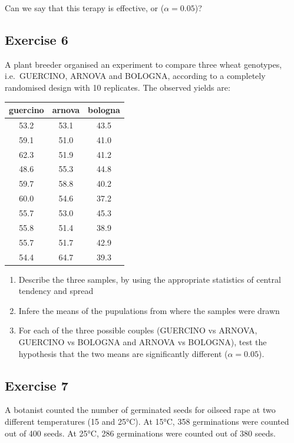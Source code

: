 \documentclass[a4paper,12pt,oneside]{book}
\providecommand{\tightlist}{%
  \setlength{\itemsep}{0pt}\setlength{\parskip}{0pt}}
\begin{document}
Can we say that this terapy is effective, or (\(\alpha = 0.05\))?

\hypertarget{exercise-6-1}{%
\subsection{Exercise 6}\label{exercise-6-1}}

A plant breeder organised an experiment to compare three wheat genotypes, i.e.~GUERCINO, ARNOVA and BOLOGNA, according to a completely randomised design with 10 replicates. The observed yields are:

\begin{tabular}{c|c|c}
\hline
guercino & arnova & bologna\\
\hline
53.2 & 53.1 & 43.5\\
\hline
59.1 & 51.0 & 41.0\\
\hline
62.3 & 51.9 & 41.2\\
\hline
48.6 & 55.3 & 44.8\\
\hline
59.7 & 58.8 & 40.2\\
\hline
60.0 & 54.6 & 37.2\\
\hline
55.7 & 53.0 & 45.3\\
\hline
55.8 & 51.4 & 38.9\\
\hline
55.7 & 51.7 & 42.9\\
\hline
54.4 & 64.7 & 39.3\\
\hline
\end{tabular}

\begin{enumerate}
\def\labelenumi{\arabic{enumi}.}
\tightlist
\item
  Describe the three samples, by using the appropriate statistics of central tendency and spread
\item
  Infere the means of the pupulations from where the samples were drawn
\item
  For each of the three possible couples (GUERCINO vs ARNOVA, GUERCINO vs BOLOGNA and ARNOVA vs BOLOGNA), test the hypothesis that the two means are significantly different (\(\alpha = 0.05\)).
\end{enumerate}

\hypertarget{exercise-7}{%
\subsection{Exercise 7}\label{exercise-7}}

A botanist counted the number of germinated seeds for oilseed rape at two different temperatures (15 and 25°C). At 15°C, 358 germinations were counted out of 400 seeds. At 25°C, 286 germinations were counted out of 380 seeds.
\end{document}
